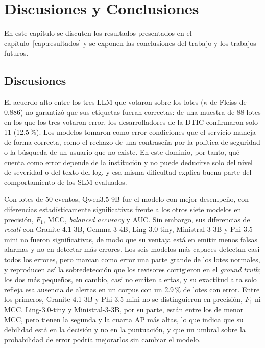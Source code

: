 \chapter{Discusiones y Conclusiones} \label{cap:conclusiones}

En este capítulo se discuten los resultados presentados en el capítulo~\ref{cap:resultados} y se exponen las conclusiones del trabajo y los trabajos futuros.

\section{Discusiones}\label{sec:discusion}\label{sec:res_discusion}

El acuerdo alto entre los tres LLM que votaron sobre los lotes ($\kappa$ de Fleiss de 0.886) no garantizó que sus etiquetas fueran correctas: de una muestra de 88 lotes en los que los tres votaron error, los desarrolladores de la DTIC confirmaron solo 11 (12.5\,\%). Los modelos tomaron como error condiciones que el servicio maneja de forma correcta, como el rechazo de una contraseña por la política de seguridad o la búsqueda de un usuario que no existe. En este dominio, por tanto, qué cuenta como error depende de la institución y no puede deducirse solo del nivel de severidad o del texto del log, y esa misma dificultad explica buena parte del comportamiento de los SLM evaluados.

Con lotes de 50 eventos, Qwen3.5-9B fue el modelo con mejor desempeño, con diferencias estadísticamente significativas frente a los otros siete modelos en precisión, $F_1$, MCC, \textit{balanced accuracy} y AUC. Sin embargo, sus diferencias de \textit{recall} con Granite-4.1-3B, Gemma-3-4B, Ling-3.0-tiny, Ministral-3-3B y Phi-3.5-mini no fueron significativas, de modo que su ventaja está en emitir menos falsas alarmas y no en detectar más errores. Los seis modelos más capaces detectan casi todos los errores, pero marcan como error una parte grande de los lotes normales, y reproducen así la sobredetección que los revisores corrigieron en el \textit{ground truth}; los dos más pequeños, en cambio, casi no emiten alertas, y su exactitud alta solo refleja esa ausencia de alertas en un corpus con un 2.9\,\% de lotes con error. Entre los primeros, Granite-4.1-3B y Phi-3.5-mini no se distinguieron en precisión, $F_1$ ni MCC. Ling-3.0-tiny y Ministral-3-3B, por su parte, están entre los de menor MCC, pero tienen la segunda y la cuarta AP más altas, lo que indica que su debilidad está en la decisión y no en la puntuación, y que un umbral sobre la probabilidad de error podría mejorarlos sin cambiar el modelo.


